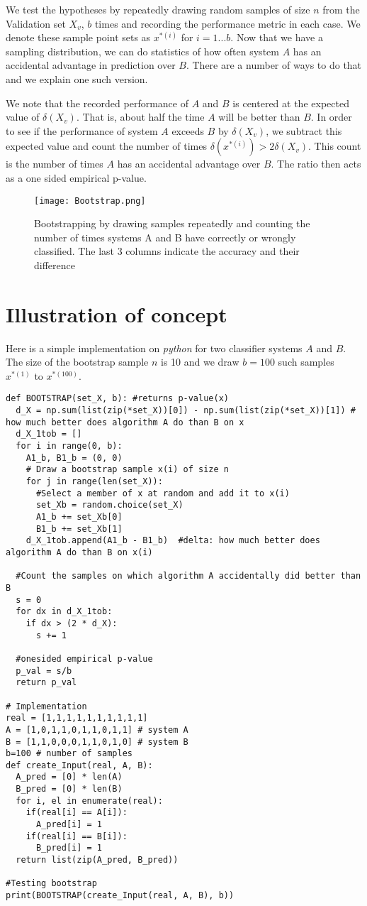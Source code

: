 \documentclass[a4paper,14pt]{extarticle}
\begin{document}
We test the hypotheses by repeatedly drawing random samples of size $n$ from the Validation set $X_v$, $b$ times and recording the performance metric in each case. We denote these sample point sets as $x^{*(i)}$ for $i=1...b$.
Now that we have a sampling distribution, we can do statistics of how often system $A$ has an accidental advantage in prediction over $B$. There are a number of ways to do that and we explain one such version.

We note that the recorded performance of $A$ and $B$ is centered at the expected value of $\delta(X_v)$. That is, about half the time $A$ will be better than $B$. In order to see if the performance of system $A$ exceeds $B$ by $\delta(X_v)$, we subtract this expected value and count the number of times $\delta(x^{*(i)}) > 2\delta(X_v)$.
This count is the number of times $A$ has an accidental advantage over $B$.  The ratio then acts as a one sided empirical p-value.
\begin{figure}[htp]
    \centering
    \texttt{[image: Bootstrap.png]}
    \caption{Bootstrapping by drawing samples repeatedly and counting the number of times systems A and B have correctly or wrongly classified. The last 3 columns indicate the accuracy and their difference}
    \label{fig:galaxy}
\end{figure}
\section{Illustration of concept}
Here is a simple implementation on \textit{python} for two classifier systems $A$ and $B$. The size of the bootstrap sample $n$ is 10 and we draw $b= 100$ such samples $x^{*(1)}$ to $x^{*(100)}$. 


\begin{lstlisting}
def BOOTSTRAP(set_X, b): #returns p-value(x)
  d_X = np.sum(list(zip(*set_X))[0]) - np.sum(list(zip(*set_X))[1]) # how much better does algorithm A do than B on x
  d_X_1tob = [] 
  for i in range(0, b):
    A1_b, B1_b = (0, 0)
    # Draw a bootstrap sample x(i) of size n
    for j in range(len(set_X)):
      #Select a member of x at random and add it to x(i)
      set_Xb = random.choice(set_X) 
      A1_b += set_Xb[0]
      B1_b += set_Xb[1]
    d_X_1tob.append(A1_b - B1_b)  #delta: how much better does algorithm A do than B on x(i)
  
  #Count the samples on which algorithm A accidentally did better than B
  s = 0  
  for dx in d_X_1tob:
    if dx > (2 * d_X):
      s += 1    
  
  #onesided empirical p-value 
  p_val = s/b      
  return p_val

# Implementation 
real = [1,1,1,1,1,1,1,1,1,1]
A = [1,0,1,1,0,1,1,0,1,1] # system A
B = [1,1,0,0,0,1,1,0,1,0] # system B
b=100 # number of samples
def create_Input(real, A, B):
  A_pred = [0] * len(A)
  B_pred = [0] * len(B)
  for i, el in enumerate(real):
    if(real[i] == A[i]):
      A_pred[i] = 1
    if(real[i] == B[i]):
      B_pred[i] = 1
  return list(zip(A_pred, B_pred))

#Testing bootstrap
print(BOOTSTRAP(create_Input(real, A, B), b))
\end{lstlisting}
\end{document}
